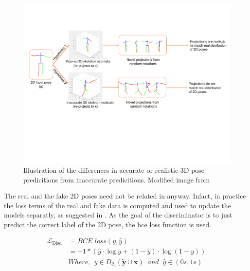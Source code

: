 \begin{figure}[h]
    \centering
    \includegraphics[width=\textwidth]{figures/h36_viz/novel_view_contraint.pdf}
    \caption{Illustration of the differences in accurate or realistic 3D pose predicitions from inaccurate predicitions. Modified image from \cite{can3dpose}}
    \label{fig:novel_view_constraint}
\end{figure}

The real and the fake 2D poses need not be related in anyway. Infact, in practice the loss terms of the real and fake data is computed and used to update the models separatly, as suggested in \cite{soumith2017wasserstein, goodfellow2014generative}. As the goal of the discriminator is to just predict the correct label of the 2D pose, the \ac{bce} loss function is used. 

\begin{equation} \label{eqn:loss_bce}
    \begin{split}
        \mathcal{L}_{\text {Disc.}} & = BCE\_loss(y, \hat{y}) \\
        & = -1 * (\hat{y} \cdot \log y + (1 - \hat{y}) \cdot \log (1 - y)) \\
        & Where, \:\: y \in D_{\theta_d}(\tilde{\textbf{y}} \cup \textbf{x}) \;\; and \;\; \hat{y} \in (0s, 1s)
    \end{split}
\end{equation}

